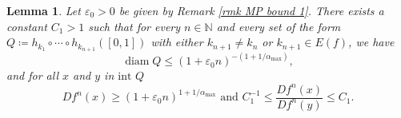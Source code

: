 \documentclass[10pt,a4paper]{amsart}
\numberwithin{equation}{section} %
\numberwithin{figure}{section} %
\newtheorem{lemm}[prop]{Lemma}
\newcommand{\N}{\mathbb{N}}
\renewcommand{\=}{\coloneqq}
\DeclareMathOperator{\diam}{diam}
\begin{document}
\begin{lemm}\label{lemma bound Df^n}
Let $\varepsilon_0>0$ be given by Remark \ref{rmk MP bound 1}. There exists a constant $C_1>1$ such that for every $n\in \N$ and every set of the form $Q\=h_{k_1}\circ\cdots\circ h_{k_{n+1}}([0,1])$ with either $k_{n+1}\neq k_{n}$ or $k_{n+1}\in E(f)$, we have
    \begin{equation}\label{distortion eq 1}
         \diam Q \leq (1+\varepsilon_0 n)^{-(1 + 1/\alpha_{\max})},
    \end{equation}
    and for all $x$ and $y$ in $\text{int }Q$
    \begin{equation}\label{distortion eq 2}
     Df^n(x) \geq (1+\varepsilon_0 n)^{1+1/\alpha_{\max}} \text{ and } C_1^{-1}\leq \frac{Df^n(x)}{Df^n(y)}\leq C_1.
    \end{equation}
    \end{lemm}
\end{document}

